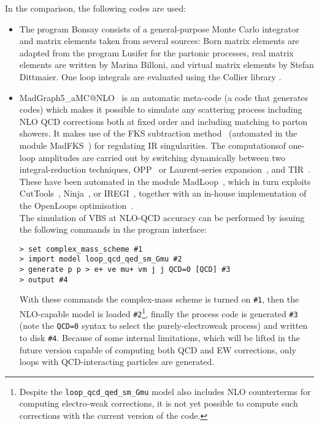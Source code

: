 In the comparison, the following codes are used: 

\begin{itemize}
 \item The program {\sc Bonsay} consists of a general-purpose Monte Carlo integrator
and matrix elements taken from several sources: Born matrix elements are
adapted from the program {\sc Lusifer} \cite{Dittmaier:2002ap} for the partonic
processes, real matrix elements are written by Marina Billoni, and virtual
matrix elements by Stefan Dittmaier.
One loop integrals are evaluated using the {\sc Collier} library
\cite{Denner:2014gla,Denner:2016kdg}.

  \item {\sc MadGraph5\_aMC@NLO}~\cite{Alwall:2014hca} is an automatic meta-code (a code that generates codes) which makes it possible to simulate any scattering process
      including NLO QCD corrections both at fixed order and including matching to parton showers. It makes use of the FKS subtraction method~\cite{Frixione:1995ms,
        Frixione:1997np} (automated in the module {\sc MadFKS}~\cite{Frederix:2009yq,
        Frederix:2016rdc}) for regulating IR singularities. The computationsof one-loop amplitudes are carried out by switching dynamically between 
        two integral-reduction techniques, OPP~\cite{Ossola:2006us} or Laurent-series expansion~\cite{Mastrolia:2012bu},
        and TIR~\cite{Passarino:1978jh,Davydychev:1991va,Denner:2005nn}. These have been automated in the module {\sc MadLoop}~\cite{Hirschi:2011pa}, which 
        in turn exploits {\sc CutTools}~\cite{Ossola:2007ax}, {\sc Ninja}~\cite{Peraro:2014cba,
        Hirschi:2016mdz}, or {\sc IREGI}~\cite{ShaoIREGI}, together with an in-house implementation of the {\sc OpenLoops} optimisation~\cite{Cascioli:2011va}.\\
        The simulation of VBS at NLO-QCD accuracy can be performed by issuing the following commands in the program interface:
\begin{verbatim}
> set complex_mass_scheme #1
> import model loop_qcd_qed_sm_Gmu #2
> generate p p > e+ ve mu+ vm j j QCD=0 [QCD] #3
> output #4
\end{verbatim}
  With these commands the complex-mass scheme is turned on {\tt \#1}, then the NLO-capable model is loaded {\tt \#2}\footnote{Despite
            the {\tt loop\_qcd\_qed\_sm\_Gmu} model also includes NLO counterterms for computing electro-weak corrections, it is not yet possible to compute such corrections 
        with the current version of the code.}, finally the process code is generated {\tt \#3} (note the {\tt QCD=0} syntax to select the purely-electroweak process)
        and written to disk {\tt \#4}. Because of some internal limitations, which will be lifted in the future version capable of computing both QCD and EW corrections, 
        only loops with QCD-interacting particles are generated.
        

\end{itemize}
